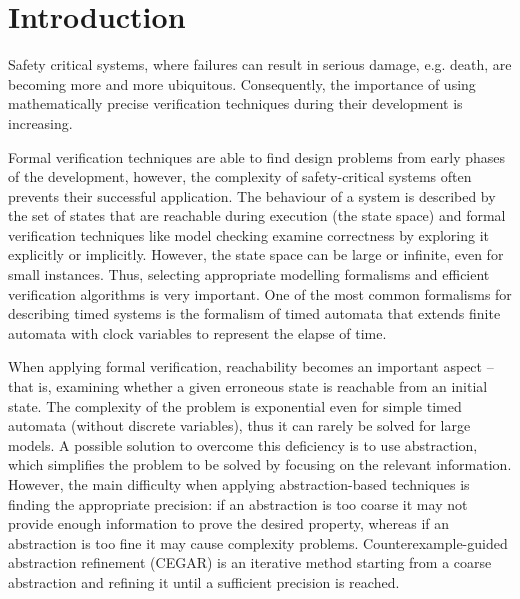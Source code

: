 \chapter{Introduction}
\label{chap:introduction}

Safety critical systems, where failures can result in serious damage, e.g. death, are becoming more and more ubiquitous. Consequently, the importance of using mathematically precise verification techniques during their development is increasing.  

Formal verification techniques are able to find design problems from early phases of the development, however, the complexity of safety-critical systems often prevents their successful application. The behaviour of a system is described by the set of states that are reachable during execution (the state space) and formal verification techniques like model checking examine correctness by exploring it explicitly or implicitly. However, the state space can be large or infinite, even for small instances. Thus, selecting appropriate modelling formalisms and efficient verification algorithms is very important. One of the most common formalisms for describing timed systems is the formalism of timed automata that extends finite automata with clock variables to represent the elapse of time.

When applying formal verification, reachability becomes an important aspect – that is, examining whether a given erroneous state is reachable from an initial state. The complexity of the problem is exponential even for simple timed automata (without discrete variables), thus it can rarely be solved for large models. A possible solution to overcome this deficiency is to use abstraction, which simplifies the problem to be solved by focusing on the relevant information. However, the main difficulty when applying abstraction-based techniques is finding the appropriate precision: if an abstraction is too coarse it may not provide enough information to prove the desired property, whereas if an abstraction is too fine it may cause complexity problems. Counterexample-guided abstraction refinement (CEGAR) is an iterative method starting from a coarse abstraction and refining it until a sufficient precision is reached.


